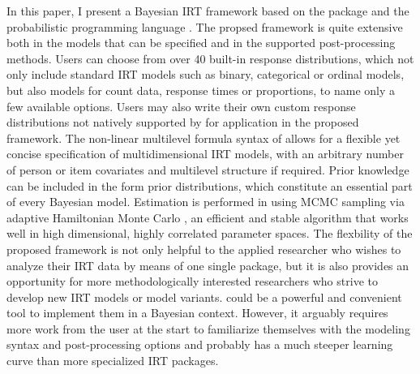 \documentclass[jss]{jss}
\begin{document}
In this paper, I present a Bayesian IRT framework based on the
 package  \citep{brms1, brms2} and the
probabilistic programming language 
\citep{carpenter2017}. The propsed framework is quite extensive both in
the models that can be specified and in the supported post-processing
methods. Users can choose from over 40 built-in response distributions,
which not only include standard IRT models such as binary, categorical
or ordinal models, but also models for count data, response times or
proportions, to name only a few available options. Users may also write
their own custom response distributions not natively supported by
 for application in the proposed framework. The non-linear
multilevel formula syntax of  allows for a flexible yet
concise specification of multidimensional IRT models, with an arbitrary
number of person or item covariates and multilevel structure if
required. Prior knowledge can be included in the form prior
distributions, which constitute an essential part of every Bayesian
model. Estimation is performed in  using MCMC sampling
via adaptive Hamiltonian Monte Carlo \citep{hoffman2014, stanM2019}, an
efficient and stable algorithm that works well in high dimensional,
highly correlated parameter spaces. The flexbility of the proposed
framework is not only helpful to the applied researcher who wishes to
analyze their IRT data by means of one single package, but it is also
provides an opportunity for more methodologically interested researchers
who strive to develop new IRT models or model variants.  could
be a powerful and convenient tool to implement them in a Bayesian
context. However, it arguably requires more work from the user at the
start to familiarize themselves with the modeling syntax and
post-processing options and probably has a much steeper learning curve
than more specialized IRT packages.
\end{document}
